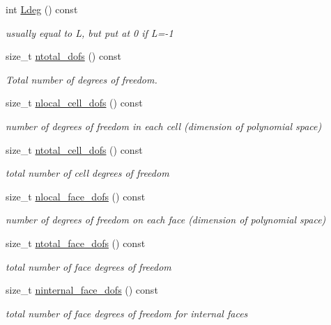 \begin{DoxyCompactItemize}
int \hyperlink{group__HybridCore_ga907fd6e5325465e94acc67c831a14cdf}{Ldeg} () const
\begin{DoxyCompactList}\small\item\em usually equal to L, but put at 0 if L=-\/1 \end{DoxyCompactList}\item 
size\+\_\+t \hyperlink{group__HybridCore_ga804722e06e20a32477cd1ae41ee6f473}{ntotal\+\_\+dofs} () const
\begin{DoxyCompactList}\small\item\em Total number of degrees of freedom. \end{DoxyCompactList}\item 
size\+\_\+t \hyperlink{group__HybridCore_ga228678f9bf8057025f3c220e40cab209}{nlocal\+\_\+cell\+\_\+dofs} () const
\begin{DoxyCompactList}\small\item\em number of degrees of freedom in each cell (dimension of polynomial space) \end{DoxyCompactList}\item 
size\+\_\+t \hyperlink{group__HybridCore_gaae30736925e857cb467c3f5c75fdc97e}{ntotal\+\_\+cell\+\_\+dofs} () const
\begin{DoxyCompactList}\small\item\em total number of cell degrees of freedom \end{DoxyCompactList}\item 
size\+\_\+t \hyperlink{group__HybridCore_ga94fa97198237f40a378a384f3d072394}{nlocal\+\_\+face\+\_\+dofs} () const
\begin{DoxyCompactList}\small\item\em number of degrees of freedom on each face (dimension of polynomial space) \end{DoxyCompactList}\item 
size\+\_\+t \hyperlink{group__HybridCore_gab2e20ded434d1aacc44927934faabc1c}{ntotal\+\_\+face\+\_\+dofs} () const
\begin{DoxyCompactList}\small\item\em total number of face degrees of freedom \end{DoxyCompactList}\item 
size\+\_\+t \hyperlink{group__HybridCore_gaffef0ee3517c408e3d086956feb022bd}{ninternal\+\_\+face\+\_\+dofs} () const
\begin{DoxyCompactList}\small\item\em total number of face degrees of freedom for internal faces \end{DoxyCompactList}\item 

\end{DoxyCompactItemize}
